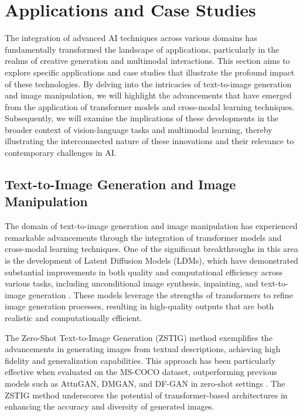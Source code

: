 








\section{Applications and Case Studies} \label{sec:Applications and Case Studies}

 

The integration of advanced AI techniques across various domains has fundamentally transformed the landscape of applications, particularly in the realms of creative generation and multimodal interactions. This section aims to explore specific applications and case studies that illustrate the profound impact of these technologies. By delving into the intricacies of text-to-image generation and image manipulation, we will highlight the advancements that have emerged from the application of transformer models and cross-modal learning techniques. Subsequently, we will examine the implications of these developments in the broader context of vision-language tasks and multimodal learning, thereby illustrating the interconnected nature of these innovations and their relevance to contemporary challenges in AI.







\subsection{Text-to-Image Generation and Image Manipulation} \label{subsec:Text-to-Image Generation and Image Manipulation}

The domain of text-to-image generation and image manipulation has experienced remarkable advancements through the integration of transformer models and cross-modal learning techniques. One of the significant breakthroughs in this area is the development of Latent Diffusion Models (LDMs), which have demonstrated substantial improvements in both quality and computational efficiency across various tasks, including unconditional image synthesis, inpainting, and text-to-image generation \cite{rombach2022high}. These models leverage the strengths of transformers to refine image generation processes, resulting in high-quality outputs that are both realistic and computationally efficient.



The Zero-Shot Text-to-Image Generation (ZSTIG) method exemplifies the advancements in generating images from textual descriptions, achieving high fidelity and generalization capabilities. This approach has been particularly effective when evaluated on the MS-COCO dataset, outperforming previous models such as AttnGAN, DMGAN, and DF-GAN in zero-shot settings \cite{ramesh2021zero}. The ZSTIG method underscores the potential of transformer-based architectures in enhancing the accuracy and diversity of generated images.



